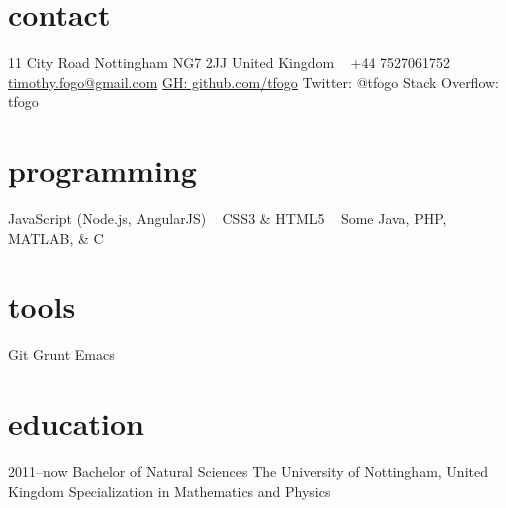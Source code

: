 \documentclass[]{friggeri-cv} %
\begin{document}


\begin{aside} %
\section{contact}
11 City Road
Nottingham
NG7 2JJ
United Kingdom
~
+44 7527061752
~
\href{mailto:timothy.fogo@gmail.com}{timothy.fogo@gmail.com}
\href{https://github.com/tfogo}{GH: github.com/tfogo}
Twitter: @tfogo
Stack Overflow: tfogo
\section{programming}
JavaScript 
(Node.js, AngularJS)
~
CSS3 \& HTML5
~
Some Java, PHP, MATLAB, \& C
\section{tools}
Git
Grunt
Emacs
\end{aside}


\section{\color{blue}education}

\begin{entrylist}
\entry
{2011--now}
{Bachelor {\normalfont of Natural Sciences}}
{The University of Nottingham, United Kingdom}
{Specialization in Mathematics and Physics}
\end{entrylist}

\end{document}
